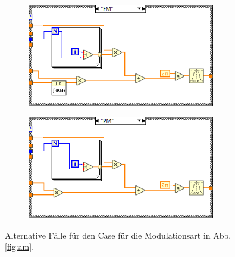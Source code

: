 \begin{figure}[H]
	\centering
	\begin{subfigure}[c]{\textwidth}
		\centering
		\includegraphics[width=0.9\textwidth]{pic/fm.png}
	\end{subfigure}
	\begin{subfigure}[c]{\textwidth}
		\centering
		\includegraphics[width=0.9\textwidth]{pic/pm.png}
	\end{subfigure}	
	\caption{Alternative Fälle für den Case für die Modulationsart in Abb. \ref{fig:am}.}
	\label{fig:fmpm}	
\end{figure}


